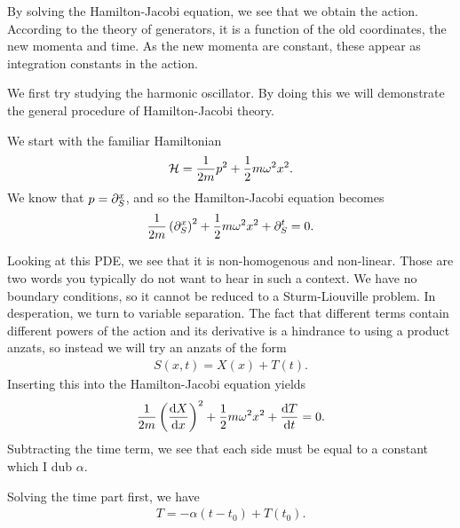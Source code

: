 By solving the Hamilton-Jacobi equation, we see that we obtain the action. According to the theory of generators, it is a function of the old coordinates, the new momenta and time. As the new momenta are constant, these appear as integration constants in the action.

We first try studying the harmonic oscillator. By doing this we will demonstrate the general procedure of Hamilton-Jacobi theory.

We start with the familiar Hamiltonian
\begin{align*}
	\mathcal{H} = \frac{1}{2m}p^{2} + \frac{1}{2}m\omega^{2}x^{2}.
\end{align*}
We know that $p = \partial^{x}_{S}$, and so the Hamilton-Jacobi equation becomes
\begin{align*}
	\frac{1}{2m}\left(\partial^{x}_{S}\right)^{2} + \frac{1}{2}m\omega^{2}x^{2} + \partial^{t}_{S} = 0.
\end{align*}

Looking at this PDE, we see that it is non-homogenous and non-linear. Those are two words you typically do not want to hear in such a context. We have no boundary conditions, so it cannot be reduced to a Sturm-Liouville problem. In desperation, we turn to variable separation. The fact that different terms contain different powers of the action and its derivative is a hindrance to using a product anzats, so instead we will try an anzats of the form
\begin{align*}
	S(x, t) = X(x) + T(t).
\end{align*}
Inserting this into the Hamilton-Jacobi equation yields
\begin{align*}
	\frac{1}{2m}\left(\dv{X}{x}\right)^{2} + \frac{1}{2}m\omega^{2}x^{2} + \dv{T}{t} = 0.
\end{align*}
Subtracting the time term, we see that each side must be equal to a constant which I dub $\alpha$.

Solving the time part first, we have
\begin{align*}
	T = -\alpha(t - t_{0}) + T(t_{0}).
\end{align*}

